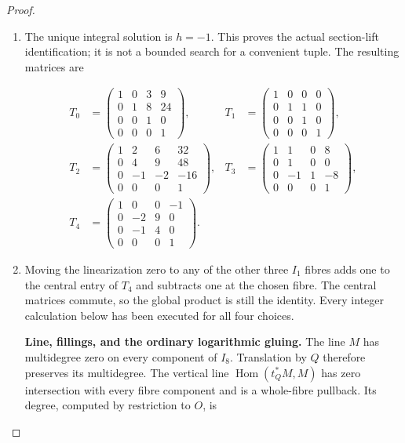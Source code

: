 \begin{proof}
\begin{enumerate}[label=\arabic*.]
\[
 16(h+1)(4h+5)=0.
\]

\item The unique integral solution is \(h=-1\).  This proves the
actual section-lift identification; it is not a bounded search
for a convenient tuple.  The resulting matrices are

\[
\begin{aligned}
 T_0&=\begin{pmatrix}1&0&3&9\\0&1&8&24\\0&0&1&0\\0&0&0&1\end{pmatrix},
 &T_1&=\begin{pmatrix}1&0&0&0\\0&1&1&0\\0&0&1&0\\0&0&0&1\end{pmatrix},\\
 T_2&=\begin{pmatrix}1&2&6&32\\0&4&9&48\\0&-1&-2&-16\\0&0&0&1\end{pmatrix},
 &T_3&=\begin{pmatrix}1&1&0&8\\0&1&0&0\\0&-1&1&-8\\0&0&0&1\end{pmatrix},\\
 T_4&=\begin{pmatrix}1&0&0&-1\\0&-2&9&0\\0&-1&4&0\\0&0&0&1\end{pmatrix}.
\end{aligned}
\]

\item Moving the linearization zero to any of the other three \(I_1\)
fibres adds one to the central entry of \(T_4\) and subtracts
one at the chosen fibre.  The central matrices commute, so the
global product is still the identity.  Every integer calculation
below has been executed for all four choices.

\par\medskip\noindent\textbf{Line, fillings, and the ordinary logarithmic gluing.}\enspace
The line \(M\) has multidegree zero on every component of
\(I_8\).  Translation by \(Q\) therefore preserves its
multidegree.  The vertical line
\(\operatorname{Hom}(t_Q^*M,M)\) has zero intersection with
every fibre component and is a whole-fibre pullback.  Its degree,
computed by restriction to \(O\), is


\end{enumerate}
\end{proof}
